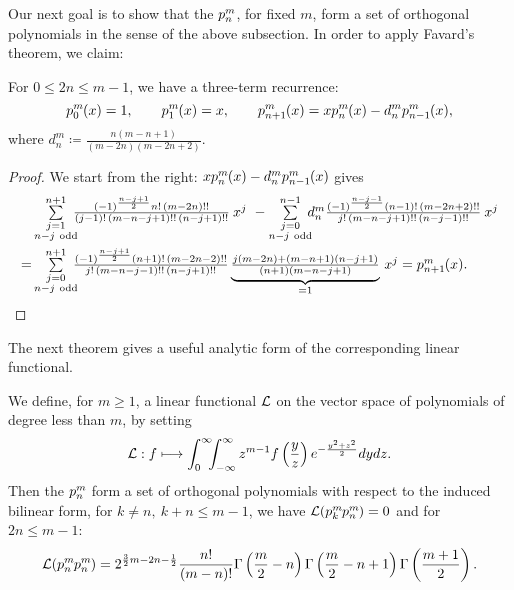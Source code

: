 Our next goal is to show that the $p_{n}^{m}\;\!\!$, for fixed $m$, form a set of orthogonal polynomials in the sense of the above subsection. In order to apply Favard's theorem, we claim:
\begin{proposition} \label{threeterm} For $0\leq 2n\leq m-1$, we have a three-term recurrence:
\begin{equation*}
\pol{0}{m}(x) = 1,\qquad \pol{1}{m}(x) = x, \qquad \pol{n+1}{m}(x) = x\pol{n}{m}(x) -d_n^m \pol{n-1}{m}(x),
\end{equation*} 
where $d_n^m\coloneqq \frac{n(m-n+1)}{(m-2n)(m-2n+2)}$.
\end{proposition}
\begin{proof}
We start from the right: $ xp_{n}^{m}\;\!\!(x) -d_n^m p_{n-1}^{m}\;\!\!(x)$ gives
\begin{align*}
 &\textstyle \sum\limits_{\substack{j=1\\ n-j\ \text{odd}}}^{n+1} \!\!\!\frac{(-1)^{\frac{n-j+1}{2}} n!\,(m-2n)!!}{(j-1)!\,(m-n-j+1)!!\,(n-j+1)!!}\: x^j 
\ - \sum\limits_{\substack{j=0\\ n-j\ \text{odd}}}^{n-1} \!\!\!d_n^m\frac{(-1)^{\frac{n-j-1}{2}} (n-1)!\,(m-2n+2)!!}{j!\,(m-n-j+1)!!\,(n-j-1)!!}\: x^j 
\\=&\textstyle \sum\limits_{\substack{j=0\\ n-j\ \text{odd}}}^{n+1} \!\!\!\frac{(-1)^{\frac{n-j+1}{2}} (n+1)!\,(m-2n-2)!!}{j!\,(m-n-j-1)!!\,(n-j+1)!!}\underbrace{\textstyle
\frac{j(m-2n)+(m-n+1)(n-j+1)}{(n+1)(m-n-j+1)}}_{=1} \,x^j = \pol{n+1}{m}(x) .\qedhere
\end{align*} 
\end{proof}
The next theorem gives a useful analytic form of the corresponding linear functional.
\begin{theorem} \label{pthm}We define, for $m\geq 1$, a linear functional $\mathcal{L}$ on the vector space of polynomials of degree less than $m$, by setting
\begin{equation}
\mathcal{L}: f \longmapsto \int_0^\infty\!\!\! \int_{-\infty}^\infty z^{m-1}f\left(\frac{y}{z}\right) e^{-\frac{y^2+z^2}{2}} dydz.
\end{equation}
Then the $p_{n}^{m}\;\!\!$ form a set of orthogonal polynomials with respect to the induced bilinear form, \ie for $k\neq n,\ k\!+\! n\leq m\!-\!1$, we have $\mathcal{L}(p_{k}^{m}\;\!\!p_{n}^{m}\;\!\!)=0$ and for $2n\leq m\!-\!1$:
\begin{equation} \label{Lpn2}
\mathcal{L}(p_{n}^{m}\;\!\!p_{n}^{m}\;\!\!) = 2^{\frac{3}{2}m-2n-\frac{1}{2}}  \frac{n!}{(m-n)!}
\Gamma\left(\frac{m}{2}-n\right)\Gamma\left(\frac{m}{2}-n+1\right)\Gamma\left(\frac{m+1}{2}\right).
\end{equation}
\end{theorem}
